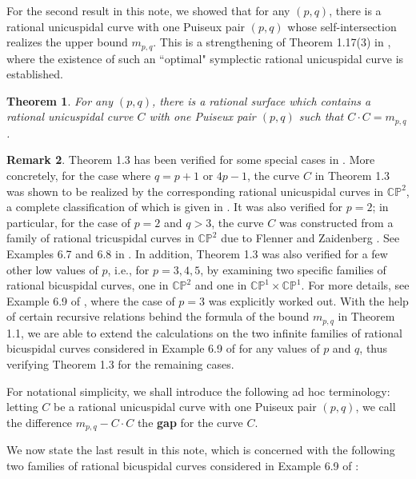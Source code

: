 \documentclass[11pt]{amsart}
\theoremstyle{plain}
\newtheorem{theorem}{Theorem}
\numberwithin{theorem}{section}
\theoremstyle{definition}
\newtheorem{remark}[theorem]{Remark}
\newcommand{\C}{{\mathbb C}}
\renewcommand{\P}{{\mathbb P}}
\begin{document}
For the second result in this note, we showed that for any $(p,q)$, there is a rational unicuspidal curve
with one Puiseux pair $(p,q)$ whose self-intersection realizes the upper bound $m_{p,q}$. This is a
strengthening of Theorem 1.17(3) in \cite{C}, where the existence of such an ``optimal" symplectic rational unicuspidal curve is established. 

\begin{theorem}
For any $(p,q)$, there is a rational surface which contains a rational unicuspidal curve $C$ with one Puiseux pair $(p,q)$ such that $C\cdot C=m_{p,q}$.
\end{theorem}

\begin{remark}
Theorem 1.3 has been verified for some special cases in \cite{C}. More concretely, for the case where $q=p+1$ or $4p-1$, the curve $C$ in Theorem 1.3 was shown to be realized by the corresponding rational unicuspidal curves in $\C\P^2$, a complete classification of which is given in \cite{F}. It was also verified for $p=2$; in particular, for the case of $p=2$ and $q>3$, the curve $C$ was constructed from a family of rational tricuspidal curves in $\C\P^2$ due to Flenner and Zaidenberg \cite{FZ}. See Examples 6.7 and  6.8 in \cite{C}. In addition, Theorem 1.3 was also verified for a few other low values of $p$, i.e., for $p=3,4,5$, by examining two specific families of rational bicuspidal curves, one in 
$\C\P^2$ and one in $\C\P^1\times \C\P^1$. For more details, see Example 6.9 of \cite{C}, where the case of $p=3$ was explicitly worked out. With the help of certain recursive relations behind the formula of the bound $m_{p,q}$ in Theorem 1.1, we are able to extend the calculations on the two infinite families of rational bicuspidal curves considered in Example 6.9 of \cite{C} for any values of $p$ and $q$, thus verifying Theorem 1.3 for the remaining cases. 

\end{remark}

For notational simplicity, we shall introduce the following ad hoc terminology: letting $C$ be a rational unicuspidal curve with one Puiseux pair $(p,q)$, we call the difference $m_{p,q}-C\cdot C$ the 
{\bf gap} for the curve $C$.

We now state the last result in this note, which is concerned with the following two families of rational bicuspidal curves considered in Example 6.9 of \cite{C}: 

\vspace{2mm}
\end{document}
